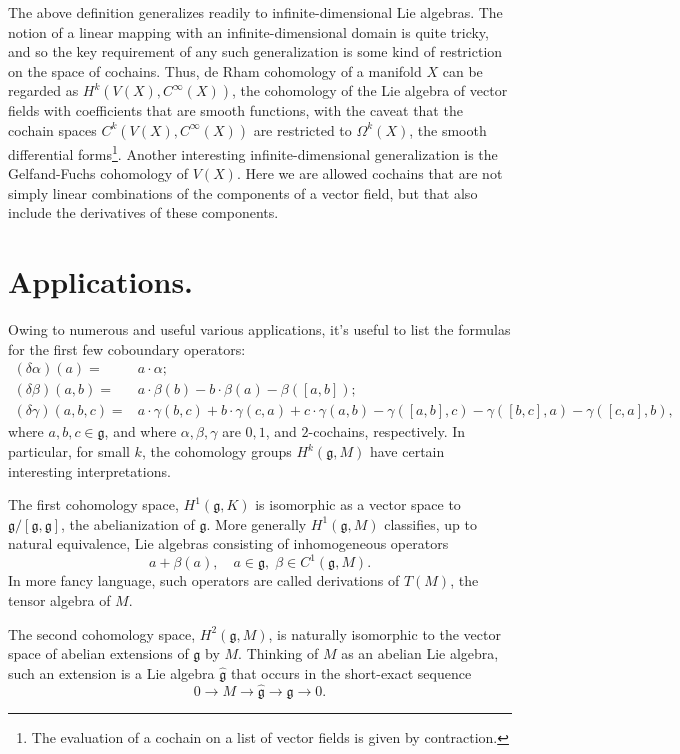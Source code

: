 \documentclass[12pt]{article}
\newcommand{\fg}{\mathfrak{g}}
\begin{document}
The above definition generalizes readily to infinite-dimensional Lie
algebras.  The notion of a linear mapping with an infinite-dimensional
domain is quite tricky, and so the key requirement of any such
generalization is some kind of restriction on the space of cochains.
Thus, de Rham cohomology of a manifold $X$ can be regarded as
$H^k(V(X), C^\infty(X))$, the cohomology of the Lie algebra of vector
fields with coefficients that are smooth functions, with the caveat
that the cochain spaces $C^k(V(X),C^\infty(X))$ are restricted to
$\Omega^k(X)$, the smooth differential forms\footnote{The
  evaluation of a cochain on a list of vector fields is given by
  contraction.}.  Another interesting infinite-dimensional
generalization is the Gelfand-Fuchs cohomology of $V(X)$.  Here we are
allowed cochains that are not simply linear combinations of the
components of a vector field, but that also include the derivatives of
these components.

\section{Applications.}
Owing to numerous and useful various applications, it's useful to list
the formulas for the first few coboundary operators:
\begin{align*}
  (\delta \alpha)(a) =& a\cdot \alpha;\\
  (\delta \beta)(a,b) =& a\cdot \beta(b) - b\cdot \beta(a)-
  \beta([a,b]);\\
  (\delta \gamma)(a,b,c) =& a\cdot \gamma(b,c) +b\cdot\gamma(c,a) +
  c\cdot\gamma(a,b) - \gamma([a,b],c) - \gamma([b,c],a) - \gamma([c,a],b),
\end{align*}
where $a,b,c\in \fg$, and where $\alpha,\beta,\gamma$ are $0, 1$, and
$2$-cochains, respectively.  In particular, for small $k$, the
cohomology groups $H^k(\fg,M)$ have certain interesting
interpretations. 

The first cohomology space, $H^1(\fg,K)$ is isomorphic as a vector
space to $\fg/[\fg,\fg]$, the abelianization of $\fg$.  More generally
$H^1(\fg,M)$ classifies, up to natural equivalence, Lie algebras
consisting of inhomogeneous operators
\[ a+\beta(a),\quad a\in \fg,\; \beta\in C^1(\fg,M). \] In more fancy
language, such operators are called derivations of $T(M)$, the tensor
algebra of $M$.  

The second cohomology space, $H^2(\fg,M)$, is naturally isomorphic to
the vector space of abelian extensions of $\fg$ by $M$.  Thinking of
$M$ as an abelian Lie algebra, such an extension is a Lie algebra
$\hat{\fg}$ that occurs in the short-exact sequence
\[0\to M\to\hat{\fg}\to\fg\to 0.\]
\end{document}

